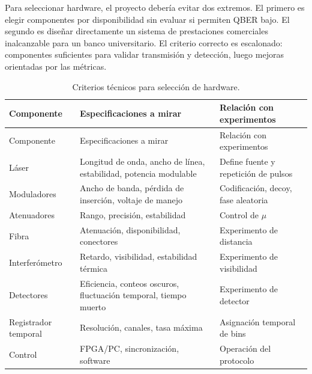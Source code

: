 Para seleccionar hardware, el proyecto debería evitar dos extremos. El primero es elegir componentes por disponibilidad sin evaluar si permiten QBER bajo. El segundo es diseñar directamente un sistema de prestaciones comerciales inalcanzable para un banco universitario. El criterio correcto es escalonado: componentes suficientes para validar transmisión y detección, luego mejoras orientadas por las métricas.

\begin{longtable}{p{}p{}p{}}
  \caption{Criterios técnicos para selección de hardware.}
  \label{tab:criterios_hardware}\\
  \toprule
  Componente & Especificaciones a mirar & Relación con experimentos \\
  \midrule
  \endfirsthead
  \toprule
  Componente & Especificaciones a mirar & Relación con experimentos \\
  \midrule
  \endhead
  Láser & Longitud de onda, ancho de línea, estabilidad, potencia modulable & Define fuente y repetición de pulsos \\
  Moduladores & Ancho de banda, pérdida de inserción, voltaje de manejo & Codificación, decoy, fase aleatoria \\
  Atenuadores & Rango, precisión, estabilidad & Control de \(\mu\) \\
  Fibra & Atenuación, disponibilidad, conectores & Experimento de distancia \\
  Interferómetro & Retardo, visibilidad, estabilidad térmica & Experimento de visibilidad \\
  Detectores & Eficiencia, conteos oscuros, fluctuación temporal, tiempo muerto & Experimento de detector \\
  Registrador temporal & Resolución, canales, tasa máxima & Asignación temporal de bins \\
  Control & FPGA/PC, sincronización, software & Operación del protocolo \\
  \bottomrule
\end{longtable}
